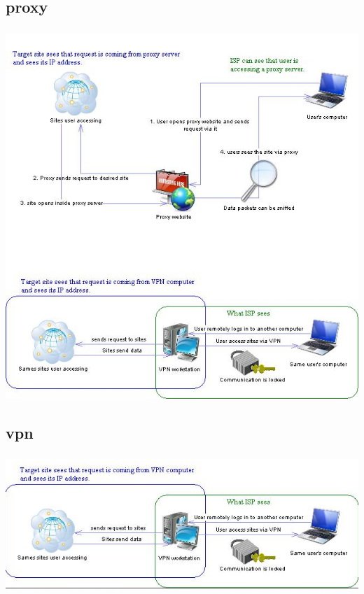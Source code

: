 \documentclass[t, 11pt]{beamer}
\begin{document}
\subsection{proxy}

\begin{frame}
	\frametitle{\insertsection}
	\frametitle{\insertsubsection}  
	\includegraphics[width=0.8\linewidth]{proxy.jpg}
\end{frame}

\subsection{vpn}

\begin{frame}
	\frametitle{\insertsection}
	\frametitle{\insertsubsection}  
	\includegraphics[width=0.8\linewidth]{vpn.png}
\end{frame}
%
%  
\end{document}
